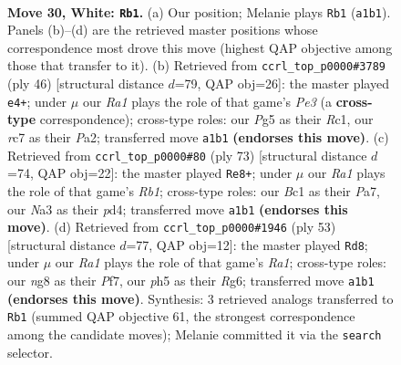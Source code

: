 \documentclass[11pt]{article}
\begin{document}
\begin{figure}[p]\centering
\begin{subfigure}{0.46\textwidth}\centering
\resizebox{\linewidth}{!}{%
\newchessgame
\chessboard[
  setfen={4Q1nr/2r3p1/1k6/2p3Pp/5P1q/N1P5/PP4K1/R1B5 w - - 2 30},
  showmover=false,
  pgfstyle=straightmove, color=movearrow, markmove={a1-b1}
]}
\caption{}
\end{subfigure}\hfill
\begin{subfigure}{0.46\textwidth}\centering
\resizebox{\linewidth}{!}{%
\newchessgame
\chessboard[
  setfen={2r4r/p3b3/q6p/2pknQ2/8/1N2P1P1/PP3P1P/2R3K1 w - - 1 24},
  showmover=false,
  pgfstyle=straightmove, color=movearrow, markmove={e3-e4}
]}
\caption{}
\end{subfigure}
\\[4pt]
\begin{subfigure}{0.46\textwidth}\centering
\resizebox{\linewidth}{!}{%
\newchessgame
\chessboard[
  setfen={1r4k1/p6p/5Qp1/3p4/1p1P3P/8/2P1KP2/q3R2R b - - 7 37},
  showmover=false,
  pgfstyle=straightmove, color=movearrow, markmove={b8-e8}
]}
\caption{}
\end{subfigure}\hfill
\begin{subfigure}{0.46\textwidth}\centering
\resizebox{\linewidth}{!}{%
\newchessgame
\chessboard[
  setfen={r7/pp2kp1Q/n1p3r1/8/2P2q2/8/PP2BP1P/1K1R3R b - - 2 27},
  showmover=false,
  pgfstyle=straightmove, color=movearrow, markmove={a8-d8}
]}
\caption{}
\end{subfigure}
\caption{\textbf{Move 30, White: \texttt{Rb1}.} (a) Our position; Melanie plays \texttt{Rb1} (\texttt{a1b1}). Panels (b)--(d) are the retrieved master positions whose correspondence most drove this move (highest QAP objective among those that transfer to it). (b) Retrieved from \texttt{ccrl\_top\_p0000\#3789} (ply 46) [structural distance $d$=79, QAP obj=26]: the master played \texttt{e4+}; under $\mu$ our \emph{Ra1} plays the role of that game's \emph{Pe3} (a \textbf{cross-type} correspondence); cross-type roles: our \emph{P}g5 as their \emph{R}c1, our \emph{r}c7 as their \emph{P}a2; transferred move \texttt{a1b1} \textbf{(endorses this move)}. (c) Retrieved from \texttt{ccrl\_top\_p0000\#80} (ply 73) [structural distance $d$=74, QAP obj=22]: the master played \texttt{Re8+}; under $\mu$ our \emph{Ra1} plays the role of that game's \emph{Rb1}; cross-type roles: our \emph{B}c1 as their \emph{P}a7, our \emph{N}a3 as their \emph{p}d4; transferred move \texttt{a1b1} \textbf{(endorses this move)}. (d) Retrieved from \texttt{ccrl\_top\_p0000\#1946} (ply 53) [structural distance $d$=77, QAP obj=12]: the master played \texttt{Rd8}; under $\mu$ our \emph{Ra1} plays the role of that game's \emph{Ra1}; cross-type roles: our \emph{n}g8 as their \emph{P}f7, our \emph{p}h5 as their \emph{R}g6; transferred move \texttt{a1b1} \textbf{(endorses this move)}. Synthesis: 3 retrieved analogs transferred to \texttt{Rb1} (summed QAP objective 61, the strongest correspondence among the candidate moves); Melanie committed it via the \texttt{search} selector.}
\label{fig:thought-m58}
\end{figure}
\end{document}
